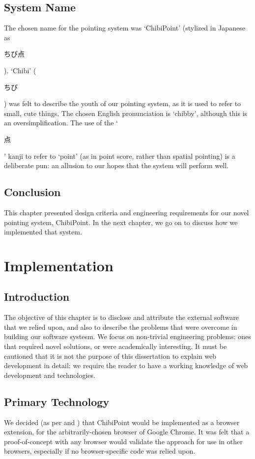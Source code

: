 \documentclass[11pt,openright,a4paper]{report}
\begin{document}
\section{System Name}
The chosen name for the pointing system was `ChibiPoint' (stylized in Japanese as \begin{CJK}{UTF8}{min}ちび点\end{CJK}). `Chibi' (\begin{CJK}{UTF8}{min}ちび\end{CJK}) was felt to describe the youth of our pointing system, as it is used to refer to small, cute things. The chosen English pronunciation is `chibby', although this is an oversimplification. The use of the `\begin{CJK}{UTF8}{min}点\end{CJK}' kanji to refer to `point' (as in point score, rather than spatial pointing) is a deliberate pun: an allusion to our hopes that the system will perform well.

\section{Conclusion}
This chapter presented design criteria and engineering requirements for our novel pointing system, ChibiPoint. In the next chapter, we go on to discuss how we implemented that system.

\chapter{Implementation}
\label{chap:implementation}
\section{Introduction}
The objective of this chapter is to disclose and attribute the external software that we relied upon, and also to describe the problems that were overcome in building our software systesm. We focus on non-trivial engineering problems: ones that required novel solutions, or were academically interesting. It must be cautioned that it is not the purpose of this dissertation to explain web development in detail: we require the reader to have a working knowledge of web development and technologies.

\section{Primary Technology}
We decided (as per  and ) that ChibiPoint would be implemented as a browser extension, for the arbitrarily-chosen browser of Google Chrome. It was felt that a proof-of-concept with any browser would validate the approach for use in other browsers, especially if no browser-specific code was relied upon.
\end{document}
